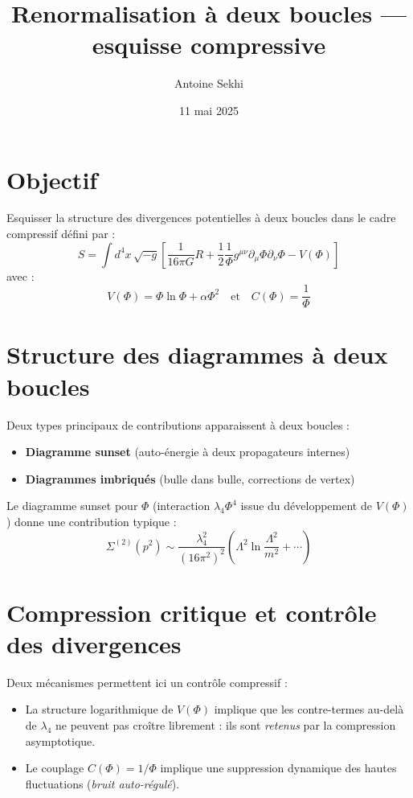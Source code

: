 \documentclass[11pt]{article}
\title{\textbf{Renormalisation à deux boucles — esquisse compressive}}
\author{Antoine Sekhi}
\date{11 mai 2025}
\begin{document}
\maketitle

\section*{Objectif}

Esquisser la structure des divergences potentielles à deux boucles dans le cadre compressif défini par :
\[ S = \int d^4x \, \sqrt{-g} \left[ \frac{1}{16\pi G} R + \frac{1}{2} \frac{1}{\Phi} g^{\mu\nu} \partial_\mu \Phi \partial_\nu \Phi - V(\Phi) \right] \]
avec :
\[ V(\Phi) = \Phi \ln \Phi + \alpha \Phi^2 \quad \text{et} \quad C(\Phi) = \frac{1}{\Phi} \]

\section{Structure des diagrammes à deux boucles}

Deux types principaux de contributions apparaissent à deux boucles :

\begin{itemize}
  \item \textbf{Diagramme sunset} (auto-énergie à deux propagateurs internes)
  \item \textbf{Diagrammes imbriqués} (bulle dans bulle, corrections de vertex)
\end{itemize}

Le diagramme sunset pour $\Phi$ (interaction $\lambda_4 \Phi^4$ issue du développement de $V(\Phi)$) donne une contribution typique :
\[ \Sigma^{(2)}(p^2) \sim \frac{\lambda_4^2}{(16\pi^2)^2} \left( \Lambda^2 \ln \frac{\Lambda^2}{m^2} + \cdots \right) \]

\section{Compression critique et contrôle des divergences}

Deux mécanismes permettent ici un contrôle compressif :
\begin{itemize}
  \item La structure logarithmique de $V(\Phi)$ implique que les contre-termes au-delà de $\lambda_4$ ne peuvent pas croître librement : ils sont \textit{retenus} par la compression asymptotique.
  \item Le couplage $C(\Phi) = 1/\Phi$ implique une suppression dynamique des hautes fluctuations (\textit{bruit auto-régulé}).
\end{itemize}
\end{document}
